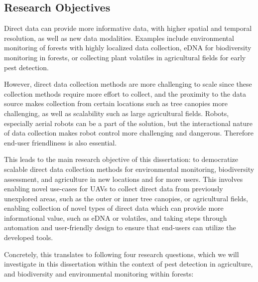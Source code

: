 \subsection{Research Objectives}

Direct data can provide more informative data, with higher spatial and temporal resolution, as well as new data modalities. Examples include environmental monitoring of forests with highly localized data collection, eDNA for biodiversity monitoring in forests, or collecting plant volatiles in agricultural fields for early pest detection. 

However, direct data collection methods are more challenging to scale since these collection methods require more effort to collect, and the proximity to the data source makes collection from certain locations such as tree canopies more challenging, as well as scalability such as large agricultural fields. Robots, especially aerial robots can be a part of the solution, but the interactional nature of data collection makes robot control more challenging and dangerous. Therefore end-user friendliness is also essential. 

This leads to the main research objective of this dissertation: to democratize scalable direct data collection methods for environmental monitoring, biodiversity assessment, and agriculture in new locations and for more users. This involves enabling novel use-cases for UAVs to collect direct data from previously unexplored areas, such as the outer or inner tree canopies, or agricultural fields, enabling collection of novel types of direct data which can provide more informational value, such as eDNA or volatiles, and taking steps through automation and user-friendly design to ensure that end-users can utilize the developed tools. 

Concretely, this translates to following four research questions, which we will investigate in this dissertation within the context of pest detection in agriculture, and biodiversity and environmental monitoring within forests:




